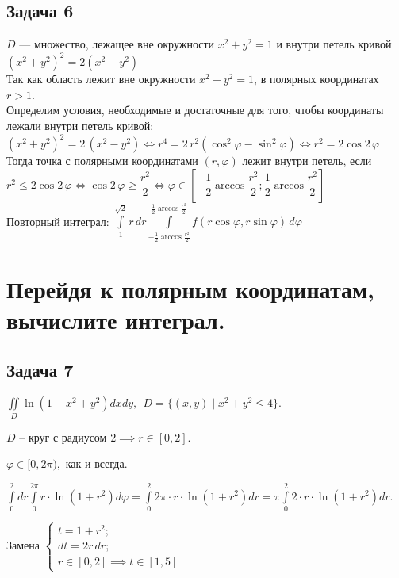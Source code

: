 \documentclass[a4paper, fleqn]{article}
\begin{document}
    \subsection*{Задача 6}
    $D$ --- множество, лежащее вне окружности $x^2 + y^2 = 1$ и внутри петель кривой $(x^2 + y^2)^2 = 2(x^2 - y^2)$ \\[5 pt]
    Так как область лежит вне окружности $x^2 + y^2 = 1$, в полярных координатах $r > 1$. \\[3 pt]
    Определим условия, необходимые и достаточные для того, чтобы координаты лежали внутри петель кривой: \\[3 pt]
    $(x^2 + y^2)^2 = 2\, (x^2 - y^2) \Leftrightarrow r^4 = 2\, r^2 (\cos^2 \varphi - \sin^2 \varphi)
     \Leftrightarrow r^2 = 2 \cos 2\, \varphi$ \\[5 pt]
     Тогда точка с полярными координатами $(r, \varphi)$ лежит внутри петель, если 
     $r^2 \le 2 \cos 2\, \varphi \Leftrightarrow \cos 2\, \varphi \ge \dfrac{r^2}2 \Leftrightarrow 
     \varphi \in \left[ -\dfrac12\arccos \dfrac{r^2}2; \dfrac12\arccos \dfrac{r^2}2 \right]$ \\
     Повторный интеграл:
     $\int\limits_{1}^{\sqrt2} r\, dr \int\limits_{-\frac12\arccos \frac{r^2}2}^{\frac12\arccos \frac{r^2}2} f(r \cos \varphi, r \sin \varphi)\, d\varphi$
    
    \section*{Перейдя к полярным координатам, вычислите интеграл.}
    \subsection*{Задача 7}
    
    $\displaystyle \iint\limits_{D} \ln (1 + x^2 + y^2) dx dy, \; \, D = \{(x,y) \mid x^2 + y^2 \leq 4 \} .$
    
    $D$ -- круг с радиусом $2 \implies r \in [0,2]$.
    
    $\varphi \in [0, 2 \pi),$ как и всегда.
    
    $\displaystyle \int\limits_{0}^{2} dr \int\limits_{0}^{2 \pi} r \cdot \ln(1 + r^2) d \varphi = \int\limits_{0}^{2} 2 \pi \cdot r \cdot \ln(1 + r^2) dr =  \pi \int\limits_{0}^{2} 2  \cdot r \cdot \ln(1 + r^2) dr.$
    
    Замена $\begin{cases} t = 1 + r^2;\\
    dt = 2r \, dr;\\
    r \in [0, 2] \implies t \in [1,5] \end{cases}$
    
\end{document}
